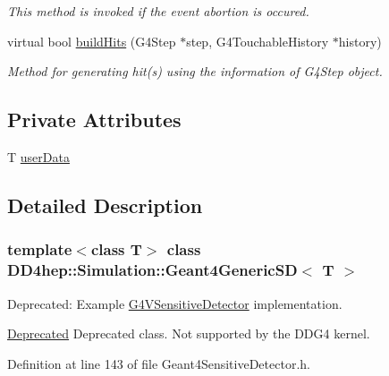 \begin{DoxyCompactItemize}
\begin{DoxyCompactList}\small\item\em This method is invoked if the event abortion is occured. \item\end{DoxyCompactList}\item 
virtual bool \hyperlink{class_d_d4hep_1_1_simulation_1_1_geant4_generic_s_d_a72d6c9cb683b9a0bd58fdbd17dc94be6}{buildHits} (G4Step $\ast$step, G4TouchableHistory $\ast$history)
\begin{DoxyCompactList}\small\item\em Method for generating hit(s) using the information of G4Step object. \item\end{DoxyCompactList}\end{DoxyCompactItemize}
\subsection*{Private Attributes}
\begin{DoxyCompactItemize}
\item 
T \hyperlink{class_d_d4hep_1_1_simulation_1_1_geant4_generic_s_d_a95379cb6ef1953981bd7f12039299e47}{userData}
\end{DoxyCompactItemize}


\subsection{Detailed Description}
\subsubsection*{template$<$class T$>$ class DD4hep::Simulation::Geant4GenericSD$<$ T $>$}

Deprecated: Example \hyperlink{class_g4_v_sensitive_detector}{G4VSensitiveDetector} implementation. \begin{Desc}
\item[\hyperlink{deprecated__deprecated000007}{Deprecated}]Deprecated class. Not supported by the DDG4 kernel. \end{Desc}


Definition at line 143 of file Geant4SensitiveDetector.h.

